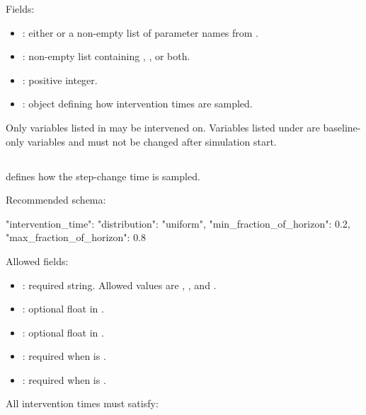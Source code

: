 \documentclass[11pt]{article}
\begin{document}
Fields:

\begin{itemize}
    \item {}: either  or a non-empty list of parameter names from .
    \item {}: non-empty list containing , , or both.
    \item {}: positive integer.
    \item {}: object defining how intervention times are sampled.
\end{itemize}

Only variables listed in  may be intervened on.
Variables listed under  are baseline-only variables and must not be changed after simulation start.

\subsection*{}

 defines how the step-change time is sampled.

Recommended schema:

\begin{DocCode}
"intervention_time": {
  "distribution": "uniform",
  "min_fraction_of_horizon": 0.2,
  "max_fraction_of_horizon": 0.8
}
\end{DocCode}

Allowed fields:

\begin{itemize}
    \item {}: required string. Allowed values are , , and .
    \item {}: optional float in \code{[0,1]}.
    \item {}: optional float in \code{[0,1]}.
    \item {}: required when  is .
    \item {}: required when  is .
\end{itemize}

All intervention times must satisfy:
\end{document}
